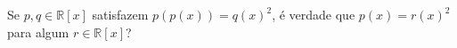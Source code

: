 Se $p,q\in\mathbb{R}[x]$ satisfazem $p(p(x))=q(x)^2$, é verdade que $p(x)=r(x)^2$ para algum $r\in\mathbb{R}[x]$?
